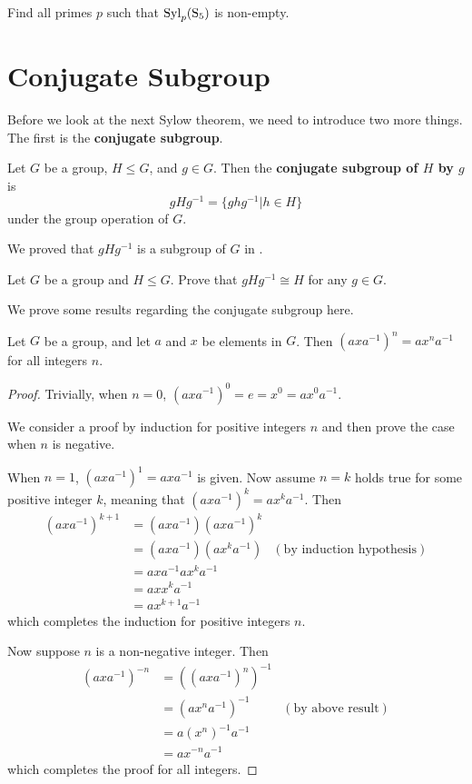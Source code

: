 \begin{exercise}
    Find all primes $p$ such that $\mathrm{Syl}_{p}(\mathrm{S}_{5})$ is non-empty.
\end{exercise}

\section{Conjugate Subgroup}
Before we look at the next Sylow theorem, we need to introduce two more things. The first is the \textbf{conjugate subgroup}.
\begin{definition}
    Let $G$ be a group, $H \leq G$, and $g \in G$. Then the \textbf{conjugate subgroup of $H$ by $g$} is
    \[
        gHg^{-1} = \{ghg^{-1} \vert h \in H\}
    \]
    under the group operation of $G$.
\end{definition}
We proved that $gHg^{-1}$ is a subgroup of $G$ in .

\begin{exercise}\label{exercise-conjugate-subgroup-isomorphic-to-subgroup}
    Let $G$ be a group and $H \leq G$. Prove that $gHg^{-1} \cong H$ for any $g \in G$.
\end{exercise}

We prove some results regarding the conjugate subgroup here.
\begin{proposition}\label{prop-power-of-conjugate-equals-conjugate-of-power}
    Let $G$ be a group, and let $a$ and $x$ be elements in $G$. Then $(axa^{-1})^n = ax^na^{-1}$ for all integers $n$.
\end{proposition}
\begin{proof}
    Trivially, when $n = 0$, $(axa^{-1})^0 = e = x^0 = ax^0a^{-1}$.
    
    We consider a proof by induction for positive integers $n$ and then prove the case when $n$ is negative.

    When $n = 1$, $(axa^{-1})^1 = axa^{-1}$ is given. Now assume $n = k$ holds true for some positive integer $k$, meaning that $(axa^{-1})^k = ax^ka^{-1}$. Then
    \begin{align*}
        (axa^{-1})^{k+1} &= (axa^{-1})(axa^{-1})^k\\
        &= (axa^{-1})(ax^ka^{-1}) & (\text{by induction hypothesis})\\
        &= axa^{-1}ax^ka^{-1}\\
        &= axx^ka^{-1}\\
        &= ax^{k+1}a^{-1}
    \end{align*}
    which completes the induction for positive integers $n$.

    Now suppose $n$ is a non-negative integer. Then
    \begin{align*}
        (axa^{-1})^{-n} &= ((axa^{-1})^n)^{-1}\\
        &= (ax^na^{-1})^{-1} & (\text{by above result})\\
        &= a(x^n)^{-1}a^{-1}\\
        &= ax^{-n}a^{-1}
    \end{align*}
    which completes the proof for all integers.
\end{proof}

